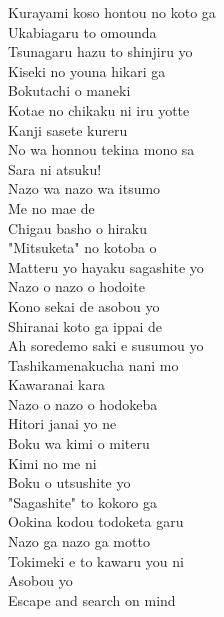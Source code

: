 \begin{multicols}{2}
Kurayami koso hontou no koto ga\\
Ukabiagaru to omounda\\
Tsunagaru hazu to shinjiru yo\\
Kiseki no youna hikari ga\\

Bokutachi o maneki\\
Kotae no chikaku ni iru yotte\\
Kanji sasete kureru\\
No wa honnou tekina mono sa\\
Sara ni atsuku!\\

Nazo wa nazo wa itsumo\\
Me no mae de\\
Chigau basho o hiraku\\
"Mitsuketa" no kotoba o\\
Matteru yo hayaku sagashite yo\\
Nazo o nazo o hodoite\\
Kono sekai de asobou yo\\

Shiranai koto ga ippai de\\
Ah soredemo saki e susumou yo\\
Tashikamenakucha nani mo\\
Kawaranai kara\\

Nazo o nazo o hodokeba\\
Hitori janai yo ne\\

Boku wa kimi o miteru\\
Kimi no me ni\\
Boku o utsushite yo\\
"Sagashite" to kokoro ga\\
Ookina kodou todoketa garu\\
Nazo ga nazo ga motto\\
Tokimeki e to kawaru you ni\\
Asobou yo\\
Escape and search on mind
\end{multicols}

\ifdefined\COMPLETE
\else
	
\fi
